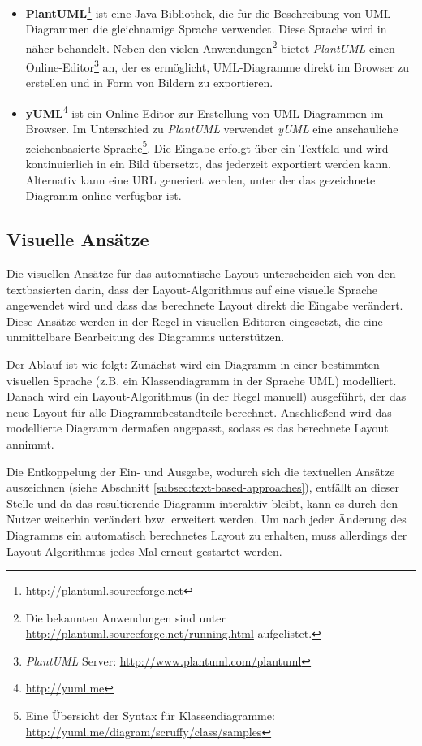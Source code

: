 \begin{itemize}
    \item \textbf{PlantUML}\footnote{\url{http://plantuml.sourceforge.net}} ist eine Java-Bibliothek, die für die Beschreibung von UML-\-Dia\-grammen die gleichnamige Sprache verwendet. Diese Sprache wird in \cite{Roques10Drawing} näher behandelt. Neben den vielen Anwendungen\footnote{Die bekannten Anwendungen sind unter \url{http://plantuml.sourceforge.net/running.html} aufgelistet.} bietet \textit{PlantUML} einen Online-Editor\footnote{\textit{PlantUML} Server: \url{http://www.plantuml.com/plantuml}} an, der es ermöglicht, UML-Diagramme direkt im Browser zu erstellen und in Form von Bildern zu exportieren.
    \item \textbf{yUML}\footnote{\url{http://yuml.me}} ist ein Online-Editor zur Erstellung von UML-Diagrammen im Browser. Im Unterschied zu \textit{PlantUML} verwendet \textit{yUML} eine anschauliche zeichenbasierte Sprache\footnote{Eine Übersicht der Syntax für Klassendiagramme: \url{http://yuml.me/diagram/scruffy/class/samples}}. Die Eingabe erfolgt über ein Textfeld und wird kontinuierlich in ein Bild übersetzt, das jederzeit exportiert werden kann. Alternativ kann eine URL generiert \cite{Fuhrmann11On-the-Pragmatics} werden, unter der das gezeichnete Diagramm online verfügbar ist.
\end{itemize}

\subsection{Visuelle Ansätze}
\label{subsec:visual-approaches}

Die visuellen Ansätze für das automatische Layout unterscheiden sich von den textbasierten darin, dass der Layout-Algorithmus auf eine visuelle Sprache angewendet wird und dass das berechnete Layout direkt die Eingabe verändert. Diese Ansätze werden in der Regel in visuellen Editoren eingesetzt, die eine unmittelbare Bearbeitung des Diagramms unterstützen.

Der Ablauf ist wie folgt: Zunächst wird ein Diagramm in einer bestimmten visuellen Sprache (z.B. ein Klassendiagramm in der Sprache UML) modelliert. Danach wird ein Layout-Algorithmus (in der Regel manuell) ausgeführt, der das neue Layout für alle Diagrammbestandteile berechnet. Anschließend wird das modellierte Diagramm dermaßen angepasst, sodass es das berechnete Layout annimmt.

Die Entkoppelung der Ein- und Ausgabe, wodurch sich die textuellen Ansätze auszeichnen (siehe Abschnitt \ref{subsec:text-based-approaches}), entfällt an dieser Stelle und da das resultierende Diagramm interaktiv bleibt, kann es durch den Nutzer weiterhin verändert bzw. erweitert werden. Um nach jeder Änderung des Diagramms ein automatisch berechnetes Layout zu erhalten, muss allerdings der Layout-Algorithmus jedes Mal erneut gestartet werden.

